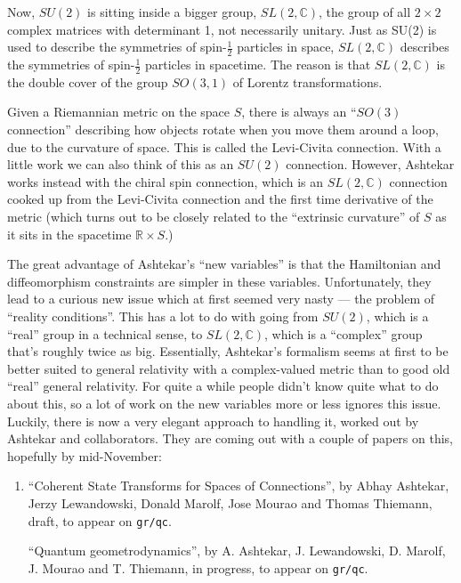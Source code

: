 \documentclass{article}
\begin{document}
Now, \(SU(2)\) is sitting inside a bigger group, \(SL(2,\mathbb{C})\),
the group of all \(2\times2\) complex matrices with determinant 1, not
necessarily unitary. Just as SU(2) is used to describe the symmetries of
spin-\(\frac12\) particles in space, \(SL(2,\mathbb{C})\) describes the
symmetries of spin-\(\frac12\) particles in spacetime. The reason is
that \(SL(2,\mathbb{C})\) is the double cover of the group \(SO(3,1)\)
of Lorentz transformations.

Given a Riemannian metric on the space \(S\), there is always an
``\(SO(3)\) connection'' describing how objects rotate when you move
them around a loop, due to the curvature of space. This is called the
Levi-Civita connection. With a little work we can also think of this as
an \(SU(2)\) connection. However, Ashtekar works instead with the chiral
spin connection, which is an \(SL(2,\mathbb{C})\) connection cooked up
from the Levi-Civita connection and the first time derivative of the
metric (which turns out to be closely related to the ``extrinsic
curvature'' of \(S\) as it sits in the spacetime
\(\mathbb{R} \times S\).)

The great advantage of Ashtekar's ``new variables'' is that the
Hamiltonian and diffeomorphism constraints are simpler in these
variables. Unfortunately, they lead to a curious new issue which at
first seemed very nasty --- the problem of ``reality conditions''. This
has a lot to do with going from \(SU(2)\), which is a ``real'' group in
a technical sense, to \(SL(2,\mathbb{C})\), which is a ``complex'' group
that's roughly twice as big. Essentially, Ashtekar's formalism seems at
first to be better suited to general relativity with a complex-valued
metric than to good old ``real'' general relativity. For quite a while
people didn't know quite what to do about this, so a lot of work on the
new variables more or less ignores this issue. Luckily, there is now a
very elegant approach to handling it, worked out by Ashtekar and
collaborators. They are coming out with a couple of papers on this,
hopefully by mid-November:

\begin{enumerate}
\def\labelenumi{\arabic{enumi})}
\setcounter{enumi}{1}
\item
  ``Coherent State Transforms for Spaces of Connections'', by Abhay
  Ashtekar, Jerzy Lewandowski, Donald Marolf, Jose Mourao and Thomas
  Thiemann, draft, to appear on \texttt{gr/qc}.

  ``Quantum geometrodynamics'', by A. Ashtekar, J. Lewandowski, D.
  Marolf, J. Mourao and T. Thiemann, in progress, to appear on
  \texttt{gr/qc}.
\end{enumerate}
\end{document}

